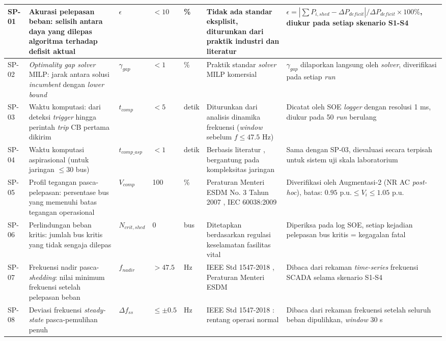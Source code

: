 \begin{longtable}{|p{0.7cm}|p{3.5cm}|p{1.3cm}|p{1.2cm}|p{1.2cm}|p{2.3cm}|p{3.3cm}|}
SP-01 & Akurasi pelepasan beban: selisih antara daya yang dilepas algoritma terhadap defisit aktual & $\epsilon$ & $<10$ & \% & Tidak ada standar eksplisit, diturunkan dari praktik industri dan literatur \cite{Sarwar2020, Arenas2026} & $\epsilon=|\sum P_{i,shed} - \Delta P_{deficit}|/\Delta P_{deficit}\times 100\%$, diukur pada setiap skenario S1-S4 \\ \hline
SP-02 & \textit{Optimality gap solver} MILP: jarak antara solusi \textit{incumbent} dengan \textit{lower bound} & $\gamma_{gap}$ & $<1$ & \% & Praktik standar \textit{solver} MILP komersial \cite{Wolsey2021} & $\gamma_{gap}$ dilaporkan langsung oleh \textit{solver}, diverifikasi pada setiap \textit{run} \\ \hline
SP-03 & Waktu komputasi: dari deteksi \textit{trigger} hingga perintah \textit{trip} CB pertama dikirim & $t_{comp}$ & $<5$ & detik & Diturunkan dari analisis dinamika frekuensi (\textit{window} sebelum $f\le 47.5$ Hz) & Dicatat oleh SOE \textit{logger} dengan resolusi 1 ms, diukur pada 50 \textit{run} berulang \\ \hline
SP-04 & Waktu komputasi aspirasional (untuk jaringan $\le 30$ bus) & $t_{comp\_asp}$ & $<1$ & detik & Berbasis literatur \cite{Sarwar2020}, bergantung pada kompleksitas jaringan & Sama dengan SP-03, dievaluasi secara terpisah untuk sistem uji skala laboratorium \\ \hline
SP-05 & Profil tegangan pasca-pelepasan: persentase bus yang memenuhi batas tegangan operasional & $V_{comp}$ & 100 & \% & Peraturan Menteri ESDM No. 3 Tahun 2007 \cite{PermenESDM2007}, IEC 60038:2009 \cite{IEC60038_2009} & Diverifikasi oleh Augmentasi-2 (NR AC \textit{post-hoc}), batas: $0.95 \text{ p.u.} \le V_{i} \le 1.05 \text{ p.u.}$ \\ \hline
SP-06 & Perlindungan beban kritis: jumlah bus kritis yang tidak sengaja dilepas & $N_{crit,shed}$ & 0 & bus & Ditetapkan berdasarkan regulasi keselamatan fasilitas vital \cite{UU30_2009} & Diperiksa pada log SOE, setiap kejadian pelepasan bus kritis = kegagalan fatal \\ \hline
SP-07 & Frekuensi nadir pasca-\textit{shedding}: nilai minimum frekuensi setelah pelepasan beban & $f_{nadir}$ & $>47.5$ & Hz & IEEE Std 1547-2018 \cite{IEEE1547_2018}, Peraturan Menteri ESDM \cite{PermenESDM2007} & Dibaca dari rekaman \textit{time-series} frekuensi SCADA selama skenario S1-S4 \\ \hline
SP-08 & Deviasi frekuensi \textit{steady-state} pasca-pemulihan penuh & $\Delta f_{ss}$ & $\le\pm 0.5$ & Hz & IEEE Std 1547-2018 \cite{IEEE1547_2018}: rentang operasi normal & Dibaca dari rekaman frekuensi setelah seluruh beban dipulihkan, \textit{window} 30 s \\
\end{longtable}

